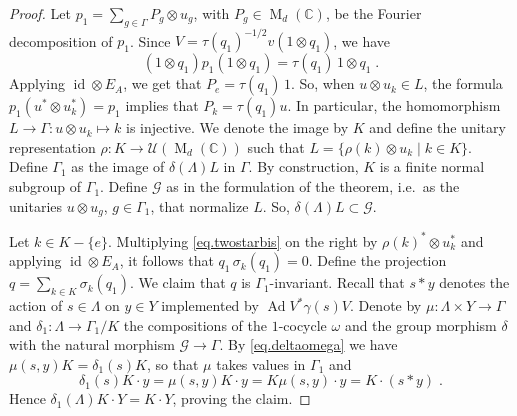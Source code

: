 \documentclass[a4paper,11pt]{amsart}
\numberwithin{equation}{section}
\begin{document}
\begin{proof}
Let $p_1 = \sum_{g \in \Gamma} P_g {\otimes} u_g$, with $P_g \in {\operatorname{M}}_d({\mathbb{C}})$, be the Fourier decomposition of $p_1$.
Since $V = \tau(q_1)^{-1/2} v (1 {\otimes} q_1)$, we have
\begin{equation}\label{eq.twostarbis}
(1 {\otimes} q_1) p_1 (1 {\otimes} q_1) = \tau(q_1) \, 1 {\otimes} q_1 \; .
\end{equation}
Applying ${\mathord{\operatorname{id}}} {\otimes} E_A$, we get that $P_e = \tau(q_1) \, 1$. So, when $u {\otimes} u_k \in L$, the formula $p_1 (u^* {\otimes} u_k^*) = p_1$ implies
that $P_k = \tau(q_1) u$. In particular, the homomorphism $L {\rightarrow} \Gamma : u {\otimes} u_k \mapsto k$ is injective. We denote the image by $K$ and define the unitary representation $\rho : K {\rightarrow} {\mathcal{U}}({\operatorname{M}}_d({\mathbb{C}}))$ such that $L = \{\rho(k) {\otimes} u_k \mid k \in K\}$. Define $\Gamma_1$ as the image of $\delta(\Lambda) L$ in $\Gamma$. By construction, $K$ is a finite normal subgroup of $\Gamma_1$. Define ${\mathcal{G}}$ as in the formulation of the theorem, i.e.\ as the unitaries $u {\otimes} u_g$, $g \in \Gamma_1$, that normalize $L$. So, $\delta(\Lambda) L \subset {\mathcal{G}}$.

Let $k \in K - \{e\}$. Multiplying \eqref{eq.twostarbis} on the right by $\rho(k)^* {\otimes} u_k^*$ and applying ${\mathord{\operatorname{id}}} {\otimes} E_A$, it follows that $q_1 \, {\sigma}_k(q_1) = 0$. Define the projection $q = \sum_{k \in K} {\sigma}_k(q_1)$. We claim that $q$ is $\Gamma_1$-invariant. Recall that $s * y$ denotes the action of $s \in \Lambda$ on $y \in Y$ implemented by ${\operatorname{Ad}} V^* \gamma(s) V$. Denote by $\mu : \Lambda \times Y {\rightarrow} \Gamma$ and $\delta_1 : \Lambda {\rightarrow} \Gamma_1/K$ the compositions of the $1$-cocycle ${\omega}$ and the group morphism $\delta$ with the natural morphism ${\mathcal{G}} {\rightarrow} \Gamma$. By \eqref{eq.deltaomega} we have $\mu(s,y) K = \delta_1(s) K$, so that $\mu$ takes values in $\Gamma_1$ and
$$\delta_1(s) K \cdot y = \mu(s,y)K \cdot y = K \mu(s,y) \cdot y = K \cdot (s * y) \; .$$
Hence $\delta_1(\Lambda)K \cdot Y = K \cdot Y$, proving the claim.


\end{proof}
\end{document}
